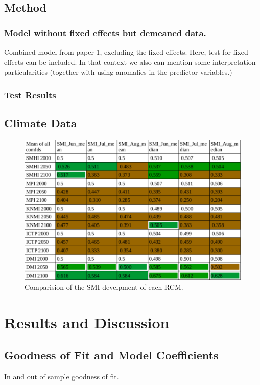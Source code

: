 \documentclass[12pt]{iopart}
\begin{document}
\subsection{Method}
\subsubsection{Model without fixed effects but demeaned data.}
Combined model from paper 1, excluding the fixed effects. Here, test for fixed effects can be included. In that context we also can mention some interpretation particularities (together with using anomalies in the predictor variables.)

\subsubsection{Test Results}

\subsection{Climate Data}
\begin{figure}
	\label{climateData:1f}
	\centering
	\includegraphics[width=1\textwidth]{figures/MeanofSMI.pdf}
	\caption{Comparision of the SMI develpment of each RCM.}
\end{figure}

\section{Results and Discussion}
\subsection{Goodness of Fit and Model Coefficients}
In and out of sample goodness of fit.
\end{document}
